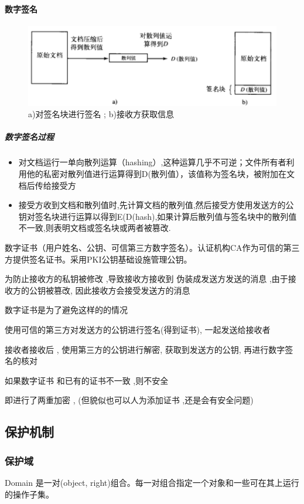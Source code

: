 \documentclass[UTF8,a4paper]{ctexart}
\begin{document}
\paragraph{数字签名}
\begin{figure}[H]
	\centering
	\includegraphics[scale = 0.5]{assets/ModernOperatingSystems/2018-01-10-20-10-53.png}
	\caption{a)对签名块进行签名 ; b)接收方获取信息}
\end{figure}
\subparagraph{数字签名过程}
\begin{itemize}
	\item 对文档运行一单向散列运算（hashing）,这种运算几乎不可逆；文件所有者利用他的私密对散列值进行运算得到D(散列值），该值称为签名块，被附加在文档后传给接受方
	\item 接受方收到文档和散列值时,先计算文档的散列值,然后接受方使用发送方的公钥对签名块进行运算以得到E(D(hash),如果计算后散列值与签名块中的散列值不一致,则表明文档或签名块或两者被篡改.
\end{itemize}
数字证书（用户姓名、公钥、可信第三方数字签名）。认证机构CA作为可信的第三方提供签名证书。采用PKI公钥基础设施管理公钥。

为防止接收方的私钥被修改 ,导致接收方接收到 伪装成发送方发送的消息 ,由于接收方的公钥被篡改, 因此接收方会接受发送方的消息

数字证书是为了避免这样的的情况 

使用可信的第三方对发送方的公钥进行签名(得到证书), 一起发送给接收者 

接收者接收后 , 使用第三方的公钥进行解密, 获取到发送方的公钥, 再进行数字签名的核对

如果数字证书 和已有的证书不一致 ,则不安全

即进行了两重加密 , (但貌似也可以人为添加证书 ,还是会有安全问题)

\subsection{保护机制}

\subsubsection{保护域}
Domain 是一对(object, right)组合。每一对组合指定一个对象和一些可在其上运行的操作子集。
\end{document}
